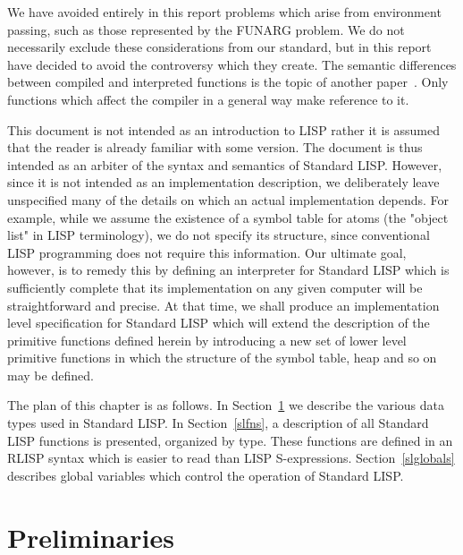 We have avoided entirely in this report problems which arise from
environment passing, such as those represented by the FUNARG problem.
We do not necessarily exclude these considerations from our standard,
but in this report have decided to avoid the controversy which they
create. The semantic differences between compiled and interpreted
functions is the topic of another paper~\cite{PLC}. Only functions
which affect the compiler in a general way make reference to it.

This document is not intended as an introduction to LISP rather it is
assumed that the reader is already familiar with some version.  The
document is thus intended as an arbiter of the syntax and semantics of
Standard LISP. However, since it is not intended as an implementation
description, we deliberately leave unspecified many of the details on
which an actual implementation depends. For example, while we assume
the existence of a symbol table for atoms (the "object list" in LISP
terminology), we do not specify its structure, since conventional LISP
programming does not require this information. Our ultimate goal,
however, is to remedy this by defining an interpreter for Standard
LISP which is sufficiently complete that its implementation on any
given computer will be straightforward and precise. At that time, we
shall produce an implementation level specification for Standard LISP
which will extend the description of the primitive functions defined
herein by introducing a new set of lower level primitive functions in
which the structure of the symbol table, heap and so on may be
defined.

The plan of this chapter is as follows. In Section~\ref{dtypes} we
describe the various data types used in Standard LISP. In
Section~\ref{slfns}, a description of all Standard LISP functions is
presented, organized by type. These functions are defined in an RLISP
syntax which is easier to read than LISP S-expressions.
Section~\ref{slglobals} describes global variables which control the
operation of Standard LISP.


\section{Preliminaries}
\label{dtypes}
